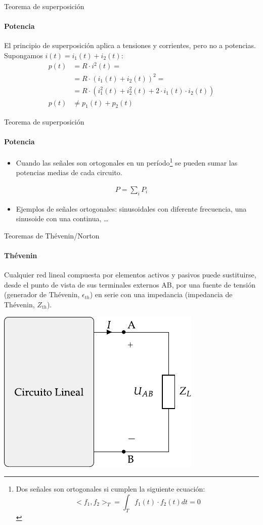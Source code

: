 \documentclass[aspectratio=169, usenames,svgnames,dvipsnames]{beamer}
\begin{document}
\begin{frame}[label={sec:orgee8ab4c}]{Teorema de superposición}
\framesubtitle{Potencia}

El principio de superposición aplica a tensiones y corrientes, pero \alert{no} a potencias. Supongamos \(i(t) = i_1(t) + i_2(t)\):
\begin{align*}
  p(t) &= R \cdot i^2(t) =\\
       &= R \cdot (i_1(t) + i_2(t))^2 =\\
       &=R \cdot (i_1^2(t) + i_2^2(t) + 2\cdot i_1(t) \cdot i_2(t))\\
  p(t) &\neq p_1(t) + p_2(t)
\end{align*}
\end{frame}
\begin{frame}[label={sec:org80aa651}]{Teorema de superposición}
\framesubtitle{Potencia}
\begin{itemize}
\item Cuando las señales son \alert{ortogonales en un período}\footnote{Dos señales son ortogonales si cumplen la siguiente ecuación: \[<f_1, f_2>_T = \int_T f_1(t) \cdot f_2(t) dt = 0\]} se pueden sumar las potencias \alert{medias} de cada circuito.
\end{itemize}
\begin{align*}
  P = \sum_i P_i
\end{align*}
\begin{itemize}
\item Ejemplos de señales ortogonales: sinusoidales con diferente frecuencia, una sinusoide con una continua, \ldots{}
\end{itemize}
\end{frame}

\begin{frame}[label={sec:orge359509}]{Teoremas de Thévenin/Norton}
\framesubtitle{Thévenin}

Cualquier \alert{red lineal} compuesta por elementos activos y pasivos puede sustituirse, desde el punto de vista de sus terminales externos AB, por una \alert{fuente de tensión} (generador de Thévenin, \(\epsilon_{th}\)) en \alert{serie} con una impedancia (impedancia de Thévenin, \(Z_{th}\)).

\begin{center}
\includegraphics[height=0.6\textheight]{../figs/EquivalenteThevenin.pdf}
\end{center}
\end{frame}
\end{document}
